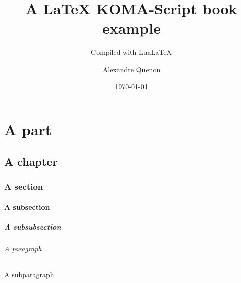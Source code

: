 \documentclass[fontsize=11pt, paper=portait,A4]{scrbook}
\title{A \LaTeX{} KOMA-Script book example}
\subtitle{Compiled with Lua\LaTeX{}}
\author{Alexandre Quenon}
\date{\today}
\begin{document}

\maketitle


\frontmatter

\tableofcontents


\mainmatter


\part{A part}

	\lipsum


\chapter{A chapter}

	\lipsum[1]


	\section{A section}
	
		\lipsum[2]
		
		
		\subsection{A subsection}
		
			\lipsum[3]
			
			
			\subsubsection{A subsubsection}
			
				\lipsum[4]
				
				
				\paragraph{A paragraph}
				
					\lipsum[5]
					
					
					\subparagraph{A subparagraph}
					
						\lipsum[6]
						
						
						
							\lipsum[7]
	


	\lipsum[1]
	
\end{document}
